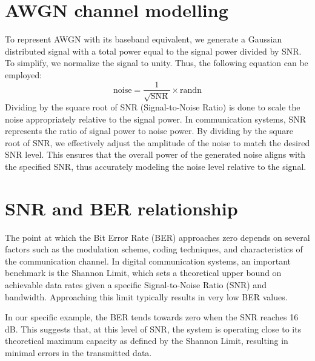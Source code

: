 \documentclass[a4paper, 12pt, english]{article}
\begin{document}
\section{AWGN channel modelling}

To represent AWGN with its baseband equivalent, we generate a Gaussian distributed signal with a total power equal to the signal power divided by SNR. To simplify, we normalize the signal to unity. Thus, the following equation can be employed: 
\[\text{noise} = \frac{1}{\sqrt{\text{SNR}}} \times \text{randn}\]
Dividing by the square root of SNR (Signal-to-Noise Ratio) is done to scale the noise appropriately relative to the signal power. In communication systems, SNR represents the ratio of signal power to noise power. By dividing by the square root of SNR, we effectively adjust the amplitude of the noise to match the desired SNR level. This ensures that the overall power of the generated noise aligns with the specified SNR, thus accurately modeling the noise level relative to the signal.

\section{SNR and BER relationship}
The point at which the Bit Error Rate (BER) approaches zero depends on several factors such as the modulation scheme, coding techniques, and characteristics of the communication channel. In digital communication systems, an important benchmark is the Shannon Limit, which sets a theoretical upper bound on achievable data rates given a specific Signal-to-Noise Ratio (SNR) and bandwidth. Approaching this limit typically results in very low BER values.

In our specific example, the BER tends towards zero when the SNR reaches 16 dB. This suggests that, at this level of SNR, the system is operating close to its theoretical maximum capacity as defined by the Shannon Limit, resulting in minimal errors in the transmitted data.

\patchcmd{\thebibliography}{\section*}{\section}{}{}
\end{document}

